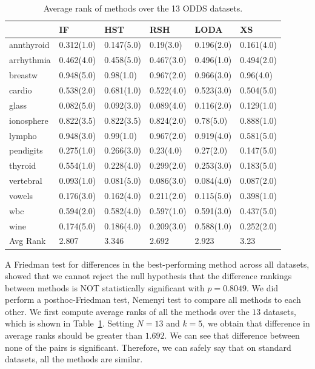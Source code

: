 \documentclass[11pt,onecolumn]{article}
\begin{document}
\begin{table}
	\centering
    \begin{tabular}{llllll}
    \toprule
                     & IF          & HST         & RSH         & LODA        & XS          \\	\hline
    annthyroid & 0.312(1.0)  & 0.147(5.0)  & 0.19(3.0)   & 0.196(2.0)  & 0.161(4.0) \\
    arrhythmia & 0.462(4.0)  & 0.458(5.0)  & 0.467(3.0)  & 0.496(1.0)  & 0.494(2.0) \\
    breastw    & 0.948(5.0)  & 0.98(1.0)   & 0.967(2.0)  & 0.966(3.0)  & 0.96(4.0) \\
    cardio     & 0.538(2.0)  & 0.681(1.0)  & 0.522(4.0)  & 0.523(3.0)  & 0.504(5.0) \\
    glass      & 0.082(5.0)  & 0.092(3.0)  & 0.089(4.0)  & 0.116(2.0)  & 0.129(1.0) \\
    ionosphere & 0.822(3.5)  & 0.822(3.5)  & 0.824(2.0)  & 0.78(5.0)   & 0.888(1.0) \\
    lympho     & 0.948(3.0)  & 0.99(1.0)   & 0.967(2.0)  & 0.919(4.0)  & 0.581(5.0) \\
    pendigits  & 0.275(1.0)  & 0.266(3.0)  & 0.23(4.0)   & 0.27(2.0)   & 0.147(5.0) \\
    thyroid   & 0.554(1.0)  & 0.228(4.0)  & 0.299(2.0)  & 0.253(3.0)  & 0.183(5.0) \\
    vertebral  & 0.093(1.0)  & 0.081(5.0)  & 0.086(3.0)  & 0.084(4.0)  & 0.087(2.0) \\
    vowels     & 0.176(3.0)  & 0.162(4.0)  & 0.211(2.0)  & 0.115(5.0)  & 0.398(1.0) \\
    wbc        & 0.594(2.0)  & 0.582(4.0)  & 0.597(1.0)  & 0.591(3.0)  & 0.437(5.0) \\
    wine       & 0.174(5.0)  & 0.186(4.0)  & 0.209(3.0)  & 0.588(1.0)  & 0.252(2.0) \\
    \midrule
    Avg Rank         & 2.807  & 3.346  & 2.692  & 2.923  & 3.23  \\
    \bottomrule
    \end{tabular}
    \caption{Average rank of methods over the 13 ODDS datasets.}
    \label{table:odds-static-rank}
\end{table}

A Friedman test for differences in the best-performing method across all datasets, showed that we cannot reject the null hypothesis that the difference rankings between methods is NOT statistically significant with $p=0.8049$. We did perform a posthoc-Friedman test, Nemenyi test to compare all methods to each other. We first compute average ranks of all the methods over the  $13$ datasets, which is shown in Table~\ref{table:odds-static-rank}. Setting $N=13$ and $k=5$, we obtain that difference in average ranks should be greater than $1.692$. We can see that difference between none of the pairs is significant. Therefore, we can safely say that on standard datasets, all the methods are similar.
\end{document}
